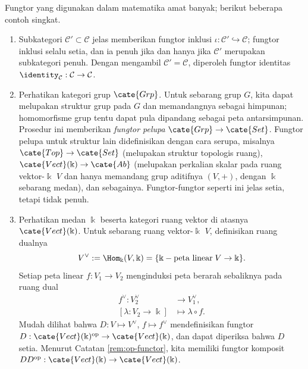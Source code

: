 \begin{example}\label{eg:functors}
	Fungtor yang digunakan dalam matematika amat banyak; berikut beberapa contoh singkat.
	\begin{enumerate}
		\item Subkategori $\mathcal{C}' \subset \mathcal{C}$ jelas memberikan fungtor inklusi $\iota: \mathcal{C}' \hookrightarrow \mathcal{C}$; fungtor inklusi selalu setia, dan ia penuh jika dan hanya jika $\mathcal{C}'$ merupakan subkategori penuh. Dengan mengambil $\mathcal{C}' = \mathcal{C}$, diperoleh fungtor identitas $\identity_{\mathcal{C}}: \mathcal{C} \to \mathcal{C}$.
		\item Perhatikan kategori grup $\cate{Grp}$. Untuk sebarang grup $G$, kita dapat melupakan struktur grup pada $G$ dan memandangnya sebagai himpunan; homomorfisme grup tentu dapat pula dipandang sebagai peta antarsimpunan. Prosedur ini memberikan \emph{fungtor pelupa} $\cate{Grp} \to \cate{Set}$. Fungtor pelupa untuk struktur lain didefinisikan dengan cara serupa, misalnya $\cate{Top} \to \cate{Set}$ (melupakan struktur topologis ruang), $\cate{Vect}(\Bbbk) \to \cate{Ab}$ (melupakan perkalian skalar pada ruang vektor-$\Bbbk$ $V$ dan hanya memandang grup aditifnya $(V, +)$, dengan $\Bbbk$ sebarang medan), dan sebagainya. Fungtor-fungtor seperti ini jelas setia, tetapi tidak penuh.
		\item Perhatikan medan $\Bbbk$ beserta kategori ruang vektor di atasnya $\cate{Vect}(\Bbbk)$. Untuk sebarang ruang vektor-$\Bbbk$ $V$, definisikan ruang dualnya 
			\[ V^\vee := \Hom_\Bbbk(V, \Bbbk) = \{ \Bbbk-\text{peta linear}\; V \to \Bbbk \}. \]
			Setiap peta linear $f: V_1 \to V_2$ menginduksi peta berarah sebaliknya pada ruang dual
			\begin{align*}
				f^\vee: V_2^\vee & \longrightarrow V_1^\vee, \\
				[\lambda: V_2 \to \Bbbk] & \longmapsto \lambda \circ f.
			\end{align*}
			Mudah dilihat bahwa $D: V \mapsto V^\vee$, $f \mapsto f^\vee$ mendefinisikan fungtor $D: \cate{Vect}(\Bbbk)^\text{op} \to \cate{Vect}(\Bbbk)$, dan dapat diperiksa bahwa $D$ setia. Menurut Catatan \ref{rem:op-functor}, kita memiliki fungtor komposit $D D^\text{op}: \cate{Vect}(\Bbbk) \to \cate{Vect}(\Bbbk)$.
			

\end{enumerate}
\end{example}
